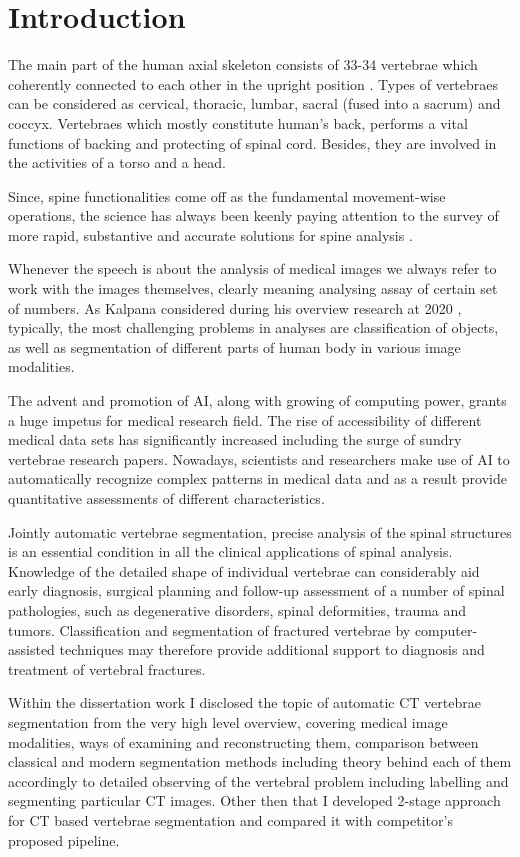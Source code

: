 \chapter{Introduction}
\label{ch:introduction}

The main part of the human axial skeleton consists of 33-34 vertebrae which coherently connected to each other in the upright position \cite{Ahlberg2005}. Types of vertebraes can be considered as cervical, thoracic, lumbar, sacral (fused into a sacrum) and coccyx. Vertebraes which mostly constitute human's back, performs a vital functions of backing and protecting of spinal cord. Besides, they are involved in the activities of a torso and a head.

Since, spine functionalities come off as the fundamental movement-wise operations, the science has always been keenly paying attention to the survey of more rapid, substantive and accurate solutions for spine analysis \cite{Litjens2017}.
 
Whenever the speech is about the analysis of medical images we always refer to work with the images themselves, clearly meaning analysing assay of certain set of numbers.
As Kalpana considered during his overview research at 2020 \cite{Kalpana2020},
typically, the most challenging problems in analyses are classification of objects, as well as segmentation of different parts of human body in various image modalities.  
 
The advent and promotion of AI, along with growing of computing power, \cite{Pham2000} grants a huge impetus for medical research field. The rise of accessibility of different medical data sets has significantly increased including the surge of sundry vertebrae research papers. Nowadays, scientists and researchers make use of AI to automatically recognize complex patterns in medical data and as a result provide quantitative assessments of different characteristics.  
 
Jointly automatic vertebrae segmentation, precise analysis of the spinal structures is an essential condition in all the clinical applications of spinal analysis. Knowledge of the detailed shape of individual vertebrae can considerably aid early diagnosis, surgical planning and follow-up assessment of a number of spinal pathologies, such as degenerative disorders, spinal deformities, trauma and tumors. Classification and segmentation of fractured vertebrae by computer-assisted techniques may therefore provide additional support to diagnosis and treatment of vertebral fractures. 

Within the dissertation work I disclosed the topic of automatic CT vertebrae segmentation from the very high level overview, covering medical image modalities, ways of examining and reconstructing them, comparison between classical and modern segmentation methods including theory behind each of them accordingly to detailed observing of the vertebral problem including labelling and segmenting particular CT images. Other then that I developed 2-stage approach for CT based vertebrae segmentation and compared it with competitor's proposed pipeline.